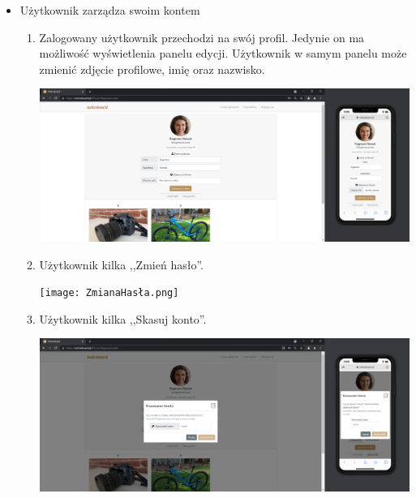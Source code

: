 \documentclass{article}
\begin{document}
\begin{itemize}
    \item Użytkownik zarządza swoim kontem
        \begin{enumerate}
            \item Zalogowany użytkownik przechodzi na swój profil. Jedynie on ma możliwość wyświetlenia panelu edycji. Użytkownik w samym panelu może zmienić zdjęcie profilowe, imię oraz nazwisko.
            \begin{center}
                    \centering  \includegraphics[width=15.5cm]{StronaUżytkownikaWłaściciel.png}
            \end{center}
            \item Użytkownik kilka ,,Zmień hasło''.
            \begin{center}
                    \centering  \texttt{[image: ZmianaHasła.png]}
            \end{center}
            \item Użytkownik kilka ,,Skasuj konto''.
            \begin{center}
                    \centering  \includegraphics[width=15.5cm]{KasowanieKonta.png}
            \end{center}
        \end{enumerate}


\end{itemize}
\end{document}
